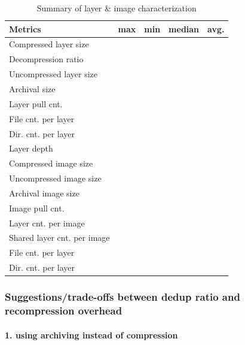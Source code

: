 \begin{table} 
	\centering 
	\scriptsize  
	\caption{Summary of layer \& image characterization} \label{tbl:redundant_ratio} 
	\begin{tabular}{|l|l|l|l|l|}%
		\hline 
		Metrics & max & min & median & avg.\\
		\hline
		Compressed layer size &   &   &   &  \\
		\hline
		Decompression ratio &   &   &    &  \\
		\hline
		Uncompressed layer size &   &   &    &  \\
		\hline
		Archival size &  &  & & \\
		\hline
		Layer pull cnt. &  &  & & \\
		\hline
		File cnt. per layer &  &  & & \\
		\hline
		Dir. cnt. per layer &  &  & & \\
		\hline
		Layer depth &  &  & & \\
		\hline
		\hline
		Compressed image size &  &  & & \\
		\hline
		Uncompressed image size & &  &  & \\
		\hline
		Archival image size & &  &  & \\
		\hline
		Image pull cnt.  &  &  & & \\
		\hline
		Layer cnt. per image  &  &  & & \\
		\hline
		Shared layer cnt. per image  &  &  & & \\
		\hline
		File cnt. per layer &  &  & & \\
		\hline
		Dir. cnt. per layer &  &  & & \\
		\hline	
	\end{tabular} 
\end{table} 

\subsubsection{Suggestions/trade-offs between dedup ratio and recompression overhead}

\paragraph{1. using archiving instead of compression}
